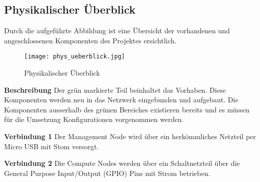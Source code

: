 \subsection{Physikalischer Überblick}
Durch die aufgeführte Abbildung ist eine Übersicht der vorhandenen und angeschlossenen Komponenten des Projektes ersichtlich.

\begin{figure}[htb]
\centering
\texttt{[image: phys\_ueberblick.jpg]}
\caption{Physikalischer Überblick}
\label{fig:Physikalischer Überblick}
\end{figure} 

\textbf{Beschreibung}\newline
Der grün markierte Teil beinhaltet das Vorhaben. Diese Komponenten werden neu in das Netzwerk eingebunden und aufgebaut. Die Komponenten ausserhalb des grünen Bereiches existieren bereits und es müssen für die Umsetzung Konfigurationen vorgenommen werden.

\textbf{Verbindung 1} \newline
Der Management Node wird über ein herkömmliches Netzteil per Micro USB mit Stom versorgt.

\textbf{Verbindung 2} \newline
Die Compute Nodes werden über ein Schaltnetzteil über die General Purpose Input/Output (GPIO) Pins mit Strom betrieben.


